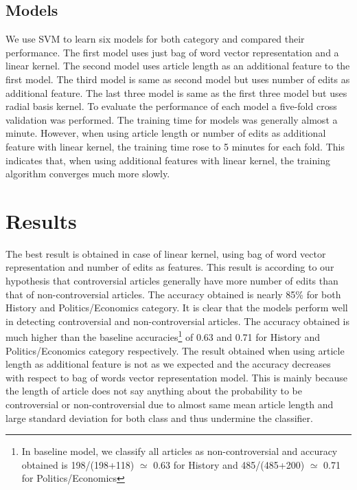 \documentclass[twocolumn]{article}
\newcommand{\comment}[1]{}
\begin{document}
  \subsection{Models}
  	We use SVM to learn six models for both category and compared their
performance. The first model uses just bag of word vector representation
and a linear kernel. The second model uses article length as an additional 
feature to the first model. The third model is same as second model but uses
number of edits as additional feature. The last three model is same as the
first three model but uses radial basis kernel. To evaluate the performance of
each model a five-fold cross validation was performed. The training time for
models was generally almost a minute. However, when using article length or 
number of edits as additional feature with linear kernel, the training time
rose to 5 minutes for each fold. This indicates that, when using additional
features with linear kernel, the training algorithm converges much more slowly.
 \comment{

 Use the following format for figures:

 \begin{figure}[t]
         \centering
         \texttt{[image: figure\_file]}
         \caption{This figure explains this.}
         \label{fig:block}
 \end{figure}

 And refer as Figure \ref{fig:block}.

 }
 \section{Results}

 The best result is obtained in case of linear kernel, using bag of word
 vector representation and number of edits as features. This result is 
 according to our hypothesis that controversial articles generally have 
 more number of edits than that of non-controversial articles. The accuracy 
 obtained is nearly 85\% for both History and Politics/Economics category.
 It is clear that the models perform well in detecting controversial and 
 non-controversial articles. The accuracy obtained is much higher than the
 baseline accuracies\footnote{In baseline model, we classify
 all articles as non-controversial and accuracy obtained is 198/(198+118) 
 $\simeq$ 0.63 for History and 485/(485+200) $\simeq$ 0.71 for Politics/Economics}
 of 0.63 and 0.71 for History and Politics/Economics category respectively. The result obtained
 when using article length as additional feature is not as we expected 
 and the accuracy decreases with respect to bag of words vector representation 
 model. This is mainly because the length of article does not say anything 
 about the probability to be controversial or non-controversial due to 
 almost same mean article length and large standard deviation for both 
 class and thus undermine the classifier.
 
\end{document}

